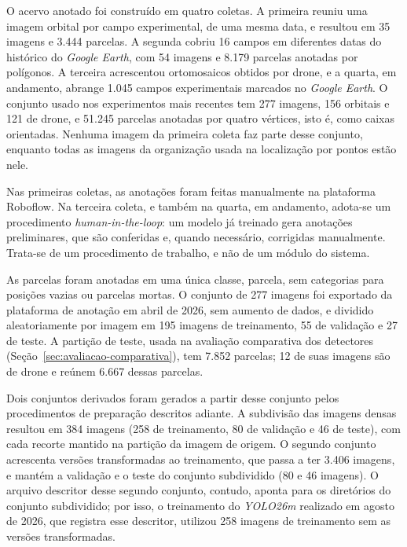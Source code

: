 O acervo anotado foi constru\'ido em quatro coletas. A primeira reuniu uma imagem orbital por campo experimental, de uma mesma data, e resultou em 35 imagens e 3.444 parcelas. A segunda cobriu 16 campos em diferentes datas do hist\'orico do \textit{Google Earth}, com 54 imagens e 8.179 parcelas anotadas por pol\'igonos. A terceira acrescentou ortomosaicos obtidos por drone, e a quarta, em andamento, abrange 1.045 campos experimentais marcados no \textit{Google Earth}. O conjunto usado nos experimentos mais recentes tem 277 imagens, 156 orbitais e 121 de drone, e 51.245 parcelas anotadas por quatro v\'ertices, isto \'e, como caixas orientadas. Nenhuma imagem da primeira coleta faz parte desse conjunto, enquanto todas as imagens da organiza\c{c}\~ao usada na localiza\c{c}\~ao por pontos est\~ao nele.

Nas primeiras coletas, as anota\c{c}\~oes foram feitas manualmente na plataforma Roboflow. Na terceira coleta, e tamb\'em na quarta, em andamento, adota-se um procedimento \textit{human-in-the-loop}: um modelo j\'a treinado gera anota\c{c}\~oes preliminares, que s\~ao conferidas e, quando necess\'ario, corrigidas manualmente. Trata-se de um procedimento de trabalho, e n\~ao de um m\'odulo do sistema.

As parcelas foram anotadas em uma \'unica classe, parcela, sem categorias para posi\c{c}\~oes vazias ou parcelas mortas. O conjunto de 277 imagens foi exportado da plataforma de anota\c{c}\~ao em abril de 2026, sem aumento de dados, e dividido aleatoriamente por imagem em 195 imagens de treinamento, 55 de valida\c{c}\~ao e 27 de teste. A parti\c{c}\~ao de teste, usada na avalia\c{c}\~ao comparativa dos detectores (Se\c{c}\~ao~\ref{sec:avaliacao-comparativa}), tem 7.852 parcelas; 12 de suas imagens s\~ao de drone e re\'unem 6.667 dessas parcelas.

Dois conjuntos derivados foram gerados a partir desse conjunto pelos procedimentos de prepara\c{c}\~ao descritos adiante. A subdivis\~ao das imagens densas resultou em 384 imagens (258 de treinamento, 80 de valida\c{c}\~ao e 46 de teste), com cada recorte mantido na parti\c{c}\~ao da imagem de origem. O segundo conjunto acrescenta vers\~oes transformadas ao treinamento, que passa a ter 3.406 imagens, e mant\'em a valida\c{c}\~ao e o teste do conjunto subdividido (80 e 46 imagens). O arquivo descritor desse segundo conjunto, contudo, aponta para os diret\'orios do conjunto subdividido; por isso, o treinamento do \textit{YOLO26m} realizado em agosto de 2026, que registra esse descritor, utilizou 258 imagens de treinamento sem as vers\~oes transformadas.

